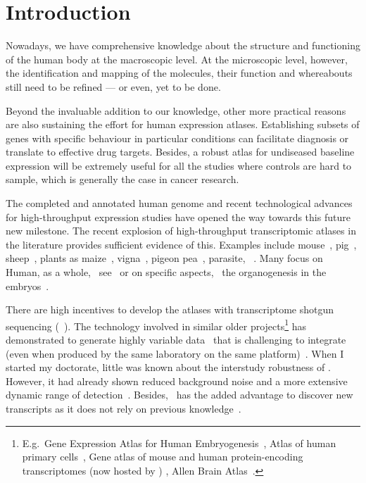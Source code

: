 \chapter*{Introduction}\label{ch:intro}

\setlength{\epigraphwidth}{0.62\textwidth}
\setlength{\epigraphrule}{0pt}


Nowadays, we have comprehensive knowledge
about the structure and functioning of the human body at the macroscopic level.
At the microscopic level, however,
the identification and mapping of the molecules, their function and whereabouts
still need to be refined --- or even, yet to be done.\mybr\

Beyond the invaluable addition to our knowledge,
other more practical reasons are also sustaining the effort
for human expression atlases.
Establishing subsets of genes with specific behaviour in particular conditions
can facilitate diagnosis or translate to effective drug targets.
Besides, a robust atlas for undiseased baseline expression will be
extremely useful for all the studies where controls are hard to sample,
which is generally the case in cancer research.

The completed and annotated human genome and
recent technological advances for high-throughput expression studies
have opened the way towards this future new milestone.
The recent explosion of high-throughput transcriptomic atlases in the literature
provides sufficient evidence of this.
Examples include mouse~, pig~,
sheep~, plants as maize~,
vigna~, pigeon pea~,
parasite, \eg\ .
Many focus on Human, as a whole,
\eg\ see~
or on specific aspects,
\eg\ the organogenesis in the embryos~.

There are high incentives to develop the atlases with
transcriptome shotgun sequencing (\ie\ \Rnaseq).
The technology involved in similar older projects\footnote{%
E.g.\ Gene Expression Atlas for Human Embryogenesis~,
Atlas of human primary cells~,
Gene atlas of mouse and human protein-encoding transcriptomes
(now hosted by ) ,
Allen Brain Atlas~.}
has demonstrated to generate highly variable data~
that is challenging to integrate
(even when produced by the same laboratory
on the same platform)~.
When I started my doctorate,
little was known about the interstudy robustness of \Rnaseq.
However, it had already shown reduced background noise and
a more extensive dynamic range of detection~.
Besides, \Rnaseq\ has the added advantage to discover new transcripts
as it does not rely on previous knowledge~.

